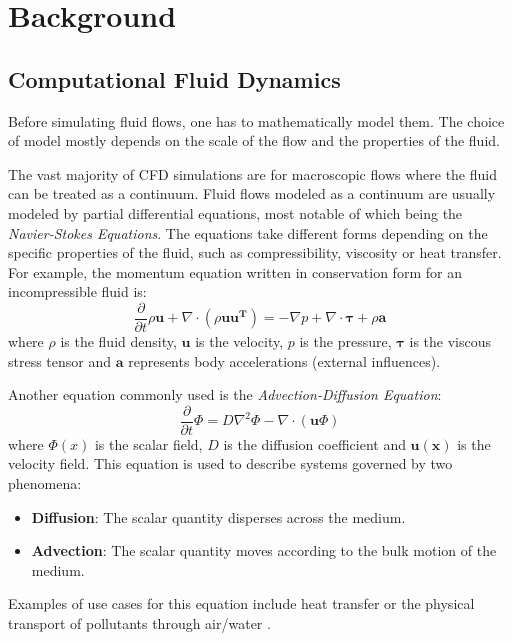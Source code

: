 \chapter{Background}
\label{chapter:background}

\section{Computational Fluid Dynamics}
\label{sec:cfd}

Before simulating fluid flows, one has to mathematically model them. The choice of model mostly depends on the scale of the flow and the properties of the fluid.

The vast majority of CFD simulations are for macroscopic flows where the fluid can be treated as a continuum.
Fluid flows modeled as a continuum are usually modeled by partial differential equations, most notable of which being the \emph{Navier-Stokes Equations}. The equations take different forms depending on the specific properties of the fluid, such as compressibility, viscosity or heat transfer.
For example, the momentum equation written in conservation form for an incompressible fluid is:
\begin{displaymath}
    \label{eq:ns}
    \frac{\partial}{\partial t} \rho \pmb{u} + \nabla \cdot (\rho \pmb{u} \pmb{u^T}) = -\nabla p + \nabla \cdot \pmb{\tau} + \rho \pmb{a}
\end{displaymath}
where $\rho$ is the fluid density, $\pmb{u}$ is the velocity, $p$ is the pressure, $\pmb{\tau}$ is the viscous stress tensor and $\pmb{a}$ represents body accelerations (external influences).

Another equation commonly used is the \emph{Advection-Diffusion Equation}:
\begin{equation}
    \frac{\partial}{\partial t}\Phi = D\nabla^{2}\Phi - \nabla \cdot (\mathbf{u}\Phi)
    \label{eq:advection-diffusion}
\end{equation}
where $\Phi(x)$ is the scalar field, $D$ is the diffusion coefficient and $\mathbf{u(x)}$ is the velocity field.
This equation is used to describe systems governed by two phenomena:
\begin{itemize}
    \item \textbf{Diffusion}: The scalar quantity disperses across the medium.
    \item \textbf{Advection}: The scalar quantity moves according to the bulk motion of the medium.
\end{itemize} 
Examples of use cases for this equation include heat transfer or the physical transport of pollutants through air/water \cite{stockie2011mathematics}.

